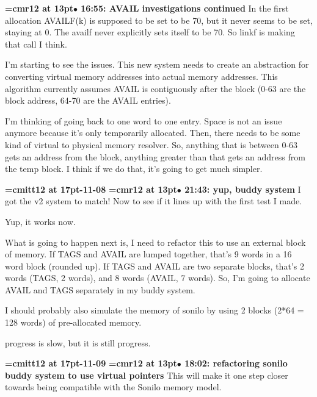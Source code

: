 {\smallskip\noindent\bf\font\titlefont=cmr12 at 13pt\titlefont $\bullet$ 16:55: AVAIL investigations continued}\smallskip
In the first allocation AVAILF(k) is supposed to be set to be 70, but it never seems to be set, staying at 0. The availf never explicitly sets itself to be 70. So linkf is making that call I think.
\par

I'm starting to see the issues. This new system needs to create an abstraction for converting virtual memory addresses into actual memory addresses. This algorithm currently assumes AVAIL is contiguously after the block (0-63 are the block address, 64-70 are the AVAIL entries).
\par

I'm thinking of going back to one word to one entry. Space is not an issue anymore because it's only temporarily allocated. Then, there needs to be some kind of virtual to physical memory resolver. So, anything that is between 0-63 gets an address from the block, anything greater than that gets an address from the temp block. I think if we do that, it's going to get much simpler.
\par

{\medskip\noindent\bf\font\titlefont=cmitt12 at 17pt-11-08}\medskip
{\smallskip\noindent\bf\font\titlefont=cmr12 at 13pt\titlefont $\bullet$ 21:43: yup, buddy system}\smallskip
I got the v2 system to match! Now to see if it lines up with the first test I made.
\par

Yup, it works now.
\par

What is going to happen next is, I need to refactor this to use an external block of memory. If TAGS and AVAIL are lumped together, that's 9 words in a 16 word block (rounded up). If TAGS and AVAIL are two separate blocks, that's 2 words (TAGS, 2 words), and 8 words (AVAIL, 7 words). So, I'm going to allocate AVAIL and TAGS separately in my buddy system.
\par

I should probably also simulate the memory of sonilo by using 2 blocks (2*64 = 128 words) of pre-allocated memory.
\par

progress is slow, but it is still progress.
\par

{\medskip\noindent\bf\font\titlefont=cmitt12 at 17pt-11-09}\medskip
{\smallskip\noindent\bf\font\titlefont=cmr12 at 13pt\titlefont $\bullet$ 18:02: refactoring sonilo buddy system to use virtual pointers}\smallskip
This will make it one step closer towards being compatible with the Sonilo memory model.
\par

